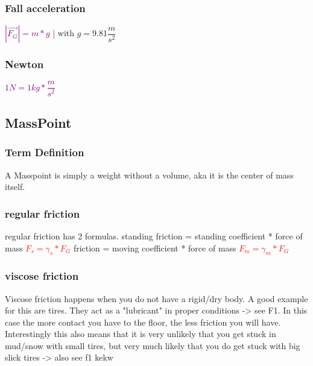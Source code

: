 \documentclass[main.tex,fontsize=8pt,paper=a4,paper=portrait,DIV=calc,]{scrartcl}
\begin{document}
\begin{multicols*}{2}
\subsubsection{Fall acceleration}
\textcolor{purple}{\(|\vec{F_G}| = m * g\)} | with \(g = 9.81\dfrac{m}{s^2}\)

\subsubsection{Newton}
\textcolor{purple}{\(1N = 1kg * \dfrac{m}{s^2}\)}\vspace{2mm}

\subsection{MassPoint}
\subsubsection{Term Definition} 
A Masspoint is simply a weight without a volume, aka it is the center of mass itself.

\subsubsection{regular friction}
regular friction has 2 formulas. \newline
standing friction = standing coefficient * force of mass \newline
\large \textcolor{red}{\(F_{s} = \gamma_s * F_G\)}\newline 
\normalsize friction = moving coefficient * force of mass \newline 
\large\textcolor{red}{\(F_{m} = \gamma_m * F_G\)} \normalsize\newline
{}

\subsubsection{viscose friction}
Viscose friction happens when you do not have a rigid/dry body.\newline
A good example for this are tires. They act as a "lubricant" in proper conditions -> see F1.\newline
In this case the more contact you have to the floor, the less friction you will have.\newline
Interestingly this also means that it is very unlikely that you get stuck in mud/snow with small tires,\newline
but very much likely that you do get stuck with big slick tires -> also see f1 kekw


\end{multicols*}
\end{document}
